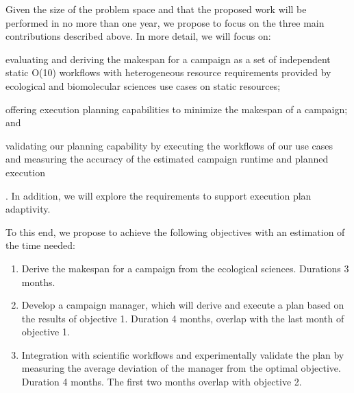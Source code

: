Given the size of the problem space and that the proposed work will be performed in no more than one year, we propose to focus on the three main contributions described above. In more detail, we will focus on: 
\begin{inparaenum}[(1)]
\item evaluating and deriving the makespan for a campaign as a set of independent static O(10) workflows with heterogeneous resource requirements provided by ecological and biomolecular sciences use cases on static resources; 
\item offering execution planning capabilities to minimize the makespan of a campaign; and 
\item validating our planning capability by executing the workflows of our use cases and measuring the accuracy of the estimated campaign runtime and planned execution
\end{inparaenum}. In addition, we will explore the requirements to support execution plan adaptivity.

To this end, we propose to achieve the following objectives with an estimation of the time needed:
\begin{enumerate}
    \item Derive the makespan for a campaign from the ecological sciences. Durations 3 months.
    \item Develop a campaign manager, which will derive and execute a plan based on the results of objective 1. Duration 4 months, overlap with the last month of objective 1.
    \item Integration with scientific workflows and experimentally validate the plan by measuring the average deviation of the manager from the optimal objective. Duration 4 months. The first two months overlap with objective 2.
\end{enumerate}


